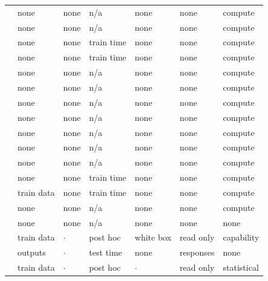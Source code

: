\begin{landscape}
\begin{longtable}{rllllll}
\cite{GHJS25} & none & none & n/a & none & none & compute \\
\cite{KPR25} & none & none & n/a & none & none & compute \\
\cite{BHJK25} & none & none & train time & none & none & compute \\
\cite{Raz16} & none & none & train time & none & none & compute \\
\cite{BB20} & none & none & n/a & none & none & compute \\
\cite{DTAPZK24} & none & none & n/a & none & none & compute \\
\cite{HKKLMT26} & none & none & n/a & none & none & compute \\
\cite{BCV16} & none & none & n/a & none & none & compute \\
\cite{GM24} & none & none & n/a & none & none & compute \\
\cite{DP20} & none & none & n/a & none & none & compute \\
\cite{DQW21} & none & none & n/a & none & none & compute \\
\cite{BS21} & none & none & train time & none & none & compute \\
\cite{KLNRS08} & train data & none & train time & none & none & compute \\
\cite{ZSWB22} & none & none & n/a & none & none & compute \\
\cite{BLW25} & none & none & n/a & none & none & none \\
\cite{SAHBS26} & train data & $\cdot$ & post hoc & white box & read only & capability \\
\cite{DSFHCFKSTT25} & outputs & $\cdot$ & test time & none & responses & none \\
\cite{SE22} & train data & $\cdot$ & post hoc & $\cdot$ & read only & statistical \\
\end{longtable}
\endgroup
\end{landscape}

